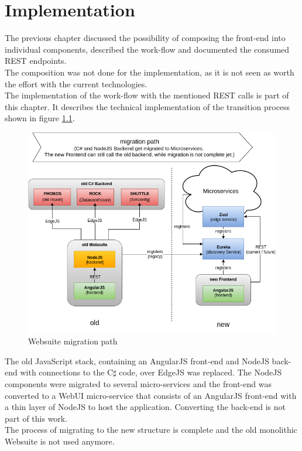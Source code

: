 
\chapter{Implementation}
The previous chapter discussed the possibility of composing the front-end into individual components, described the work-flow and documented the consumed REST endpoints.\\
The composition was not done for the implementation, as it is not seen as worth the effort with the current technologies.\\
The implementation of the work-flow with the mentioned REST calls is part of this chapter. It describes the technical implementation of the transition process shown in figure \ref{fig:websuite-migration}.
\begin{figure}[H]
	\centering\includegraphics[width=1\textwidth]{res/Websuite_migration}
	\caption{Websuite migration path}
	\label{fig:websuite-migration}
\end{figure}
The old JavaScript stack, containing an AngularJS front-end and NodeJS back-end with connections to the C$\sharp$ code, over EdgeJS was replaced. The NodeJS components were migrated to several micro-services and the front-end was converted to a WebUI micro-service that consists of an AngularJS front-end with a thin layer of NodeJS to host the application. Converting the back-end is not part of this work.\\
The process of migrating to the new structure is complete and the old monolithic Websuite is not used anymore.



